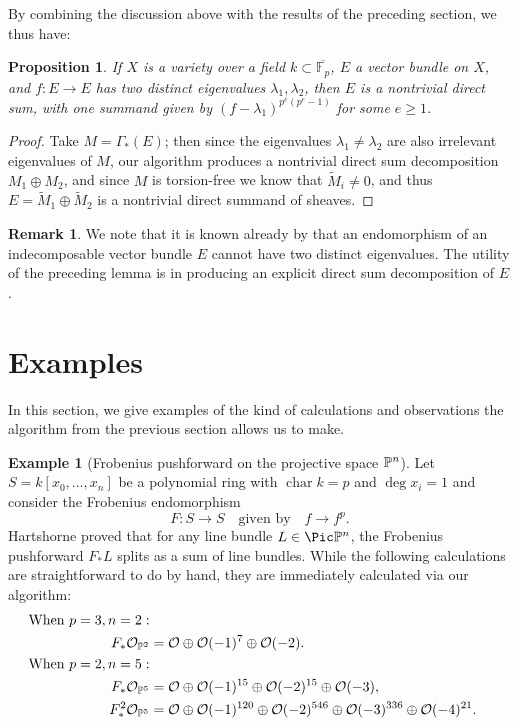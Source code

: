 \documentclass[12pt]{article}
\let\l\lambda
\def\OO{\mathcal O}
\def\FF{\mathbb F}
\theoremstyle{theorem}
\numberwithin{thm}{section}
\newtheorem{prop}[thm]{Proposition}
\theoremstyle{definition}
\newtheorem{exa}[thm]{Example}
\newtheorem{rem}[thm]{Remark}
\begin{document}
By combining the discussion above with the results of the preceding section, we thus have:

\begin{prop}
If $X$ is a variety over a field $k\subset \overline{\FF_{p}}$,
$E$ a vector bundle on $X$, and $f:E\to E$ has two distinct eigenvalues $\l_1,\l_2$, then $E$ is a nontrivial direct sum, with one summand given by $(f-\l_1)^{p^e(p^e-1)}$ for some $e\geq 1$.
\end{prop}

\begin{proof}
Take $M= \Gamma_*(E)$; then since the eigenvalues $\l_1\neq \l_2$ are also irrelevant eigenvalues of $M$, our algorithm produces a nontrivial direct sum decomposition $M_1\oplus M_2$, and since $M$ is torsion-free we know that $\widetilde M_i\neq 0$, and thus $E=\widetilde M_1\oplus \widetilde M_2$ is a nontrivial direct summand of sheaves.
\end{proof}

\begin{rem}
We note that it is known already by \cite[Proposition~15]{Atiyah57} that an endomorphism of an indecomposable vector bundle $E$ cannot have two distinct eigenvalues. The utility of the preceding lemma is in producing an explicit direct sum decomposition of $E$.
\end{rem}



\section{Examples}

In this section, we give examples of the kind of calculations and observations the algorithm from the previous section allows us to make.

\renewcommand{\char}{\operatorname{char}}

\begin{exa}[Frobenius pushforward on the projective space $\P^n$]
  Let $S = k[x_0,\dots,x_n]$ be a polynomial ring with $\char k = p$ and $\deg x_i = 1$ and consider the Frobenius endomorphism
  \[ F\colon S\to S \quad \text{given by} \quad f \to f^p. \]
  Hartshorne \cite{Hartshorne1970} proved that for any line bundle $L\in\Pic\P^n$, the Frobenius pushforward $F_*L$ splits as a sum of line bundles. While the following calculations are straightforward to do by hand, they are immediately calculated via our algorithm:
  \begin{align*}
    \text{When }p=3, n=2: \\
    F_*\OO_{\P^2} &= \OO \oplus \OO(-1)^7 \oplus \OO(-2). \\
    \text{When } p=2, n=5: \\
    F_*\OO_{\P^5} &= \OO \oplus \OO(-1)^{15} \oplus \OO(-2)^{15} \oplus \OO(-3), \\
    F_*^2\OO_{\P^5} &= \OO \oplus \OO(-1)^{120} \oplus \OO(-2)^{546} \oplus \OO(-3)^{336} \oplus \OO(-4)^{21}.
  \end{align*}
\end{exa}
\end{document}
